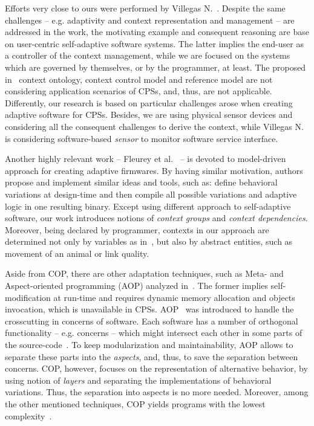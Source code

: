 Efforts very close to ours were performed by Villegas N.~\cite{VilegasPhD11}.
Despite the same challenges -- e.g. adaptivity and context representation and
management -- are addressed in the work, the motivating example and consequent
reasoning are base on user-centric self-adaptive software systems. The latter
implies the end-user as a controller of the context management, while we are
focused on the systems which are governed by themselves, or by the programmer,
at least. The proposed in~\cite{VilegasPhD11} context ontology, context control
model and reference model are not considering application scenarios of CPSs,
and, thus, are not applicable. Differently, our research is based on particular
challenges arose when creating adaptive software for CPSs. Besides, we are using
physical sensor devices and considering all the consequent challenges to derive
the context, while Villegas N.~\cite{VilegasPhD11} is considering software-based
\emph{sensor} to monitor software service interface.

Another highly relevant work -- Fleurey et
al.~\cite{Fleureya-adaptive-firmwares11} -- is devoted to model-driven approach
for creating adaptive firmwares. By having similar motivation, authors propose
and implement similar ideas and tools, such as: define behavioral variations at
design-time and then compile all possible variations and adaptive logic in one
resulting binary. Except using different approach to self-adaptive software, our
work introduces notions of \emph{context groups} and \emph{context
dependencies}. Moreover, being declared by programmer, contexts in our approach
are determined not only by variables as in~\cite{Fleureya-adaptive-firmwares11},
but also by abstract entities, such as movement of an animal or link quality.

Aside from COP, there are other adaptation techniques, such as Meta- and
Aspect-oriented programming (AOP) analyzed
in~\cite{SalvaneschiTBP}. The former implies
self-modification at run-time and requires dynamic memory allocation and objects
invocation, which is unavailable in CPSs. AOP~\cite{Kiczales:AOP:97} was
introduced to handle the crosscutting in concerns of software. Each software has
a number of orthogonal functionality -- e.g. concerns -- which might intersect
each other in some parts of the source-code~\cite{Tarr:concerns:99}. To keep
modularization and maintainability, AOP allows to separate these parts into the
\emph{aspects}, and, thus, to save the separation between concerns. COP,
however, focuses on the representation of alternative behavior, by using notion
of \emph{layers} and separating the implementations of behavioral variations.
Thus, the separation into aspects is no more needed. Moreover, among the other
mentioned techniques, COP yields programs with the lowest
complexity~\cite{SalvaneschiTBP}.



